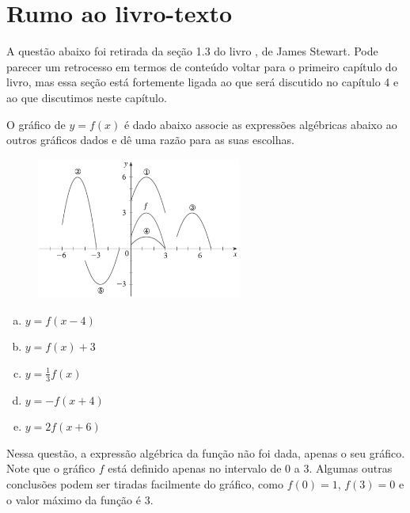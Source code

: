 \documentclass[main_estudante.tex]{subfiles}
\begin{document}
\newpage

\section{Rumo ao livro-texto}

A questão abaixo foi retirada da seção 1.3 do livro , de James Stewart. Pode parecer um retrocesso em termos de conteúdo voltar para o primeiro capítulo do livro, mas essa seção está fortemente ligada ao que será discutido no capítulo 4 e ao que discutimos neste capítulo.

\begin{resolvida}
O gráfico de $y=f(x)$ é dado abaixo associe as expressões algébricas abaixo ao outros gráficos dados e dê uma razão para as suas escolhas.

\begin{figure}[h]
\centering
\includegraphics[width=0.6\textwidth]{./img/c7r1.png}
\end{figure}

\begin{enumerate}[a)]
\item $y=f(x-4)$
\item $y=f(x)+3$
\item $y= \frac{1}{3}f(x)$
\item $y=-f(x+4)$
\item $y=2f(x+6)$
\end{enumerate}
\end{resolvida}

Nessa questão, a expressão algébrica da função não foi dada, apenas o seu gráfico. Note que o gráfico $f$ está definido apenas no intervalo de $0$ a $3$. Algumas outras conclusões podem ser tiradas facilmente do gráfico, como $f(0)=1$, $f(3)=0$ e o valor máximo da função é $3$.
\end{document}
